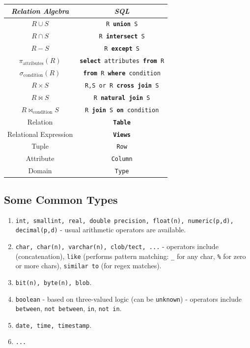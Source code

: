 \documentclass[twocolumn,english]{article}
\providecommand{\tabularnewline}{\\}
\providecommand{\tabularnewline}{\\}
\begin{document}
\noindent 
\begin{table}[H]
\noindent \centering{}%
\begin{tabular}{cc}
\toprule 
\addlinespace
\emph{Relation Algebra}  & \emph{SQL}\tabularnewline
\midrule
\addlinespace
$R\cup S$  & \texttt{R }\texttt{\textbf{union}}\texttt{ S}\tabularnewline
\addlinespace
$R\cap S$  & \texttt{R }\texttt{\textbf{intersect}}\texttt{ S}\tabularnewline
\addlinespace
$R-S$  & \texttt{R }\texttt{\textbf{except}}\texttt{ S}\tabularnewline
\addlinespace
$\pi_{\mbox{attributes}}\left(R\right)$  & \texttt{\textbf{select}}\texttt{ attributes }\texttt{\textbf{from}}\texttt{
R}\tabularnewline
\addlinespace
$\sigma_{\mbox{condition}}\left(R\right)$  & \texttt{\textbf{from}}\texttt{ R }\texttt{\textbf{where}}\texttt{
condition}\tabularnewline
\addlinespace
$R\times S$  & \texttt{R,S or R }\texttt{\textbf{cross join}}\texttt{ S}\tabularnewline
\addlinespace
$R\bowtie S$  & \texttt{R }\texttt{\textbf{natural join}}\texttt{ S}\tabularnewline
\addlinespace
$R\bowtie_{\mbox{condition}}S$  & \texttt{R }\texttt{\textbf{join}}\texttt{ S }\texttt{\textbf{on}}\texttt{
condition}\tabularnewline
\midrule
\addlinespace
Relation  & \texttt{\textbf{Table}}\tabularnewline
\addlinespace
Relational Expression  & \texttt{\textbf{Views}}\tabularnewline
\addlinespace
Tuple  & \texttt{Row}\tabularnewline
\addlinespace
Attribute  & \texttt{Column}\tabularnewline
\addlinespace
Domain  & \texttt{Type}\tabularnewline
\bottomrule
\end{tabular}
\end{table}



\subsection{Some Common Types}
\begin{enumerate}
\item \texttt{int, smallint, real, double precision, float(n), numeric(p,d),
decimal(p,d)} - usual arithmetic operators are available. 
\item \texttt{char, char(n), varchar(n), clob/tect, ...} - operators include
\texttt{\textbar{}\textbar{}} (concatenation), \texttt{like} (performs
pattern matching: \texttt{\_} for any char, \texttt{\%} for zero or
more chars), \texttt{similar to} (for regex matches). 
\item \texttt{bit(n), byte(n), blob}. 
\item \texttt{boolean} - based on three-valued logic (can be \texttt{unknown})
- operators include \texttt{between}, \texttt{not between}, \texttt{in},
\texttt{not in}. 
\item \texttt{date, time, timestamp}. 
\item \texttt{...} 
\end{enumerate}
\end{document}
